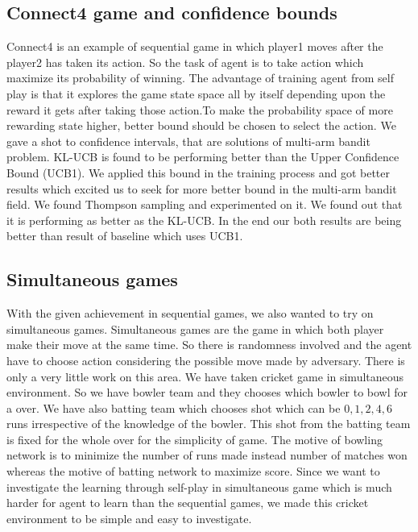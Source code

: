 \subsection{Connect4 game and confidence bounds}
Connect4 is an example of sequential game in which player1 moves after the player2 has taken its action. So the task of agent is to take action which maximize its probability of winning. The advantage of training agent from self play is that it explores the game state space all by itself depending upon the reward it gets after taking those action.To make the probability space of more rewarding state higher, better bound should be chosen to select the action. We gave a shot to confidence intervals, that are solutions of multi-arm bandit problem. KL-UCB \cite{klucb} is found to be performing better than the Upper Confidence Bound (UCB1). We applied this bound in the training process and got better results which excited us to seek for more better bound in the multi-arm bandit field. We found Thompson sampling and experimented on it. We found out that it is performing as better as the KL-UCB. In the end our both results are being better than result of baseline which uses UCB1.

\subsection{Simultaneous games}
With the given achievement in sequential games, we also wanted to try on simultaneous games.
Simultaneous games are the game in which both player make their move at the same time. So there is randomness involved and the agent have to choose action considering the possible move made by adversary. There is only a very little work on this area. We have taken cricket game in simultaneous environment. So we have bowler team and they chooses which bowler to bowl for a over. We have also batting team which chooses shot which can be $0, 1, 2, 4, 6$ runs irrespective of the knowledge of the bowler. This shot from the batting team is fixed for the whole over for the simplicity of game. The motive of bowling network is to minimize the number of runs made instead number of matches won whereas the motive of batting network to maximize score. Since we want to investigate the learning through self-play in simultaneous game which is much harder for agent to learn than the sequential games, we made this cricket environment to be simple and easy to investigate. 
